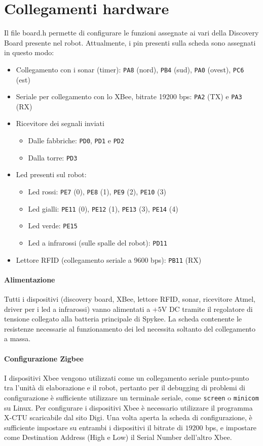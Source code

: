 \section{Collegamenti hardware}
Il file board.h permette di configurare le funzioni assegnate ai vari della Discovery Board presente nel robot. Attualmente, i pin presenti sulla scheda sono assegnati in questo modo:
\begin{itemize}
\item Collegamento con i sonar (timer): \verb|PA8| (nord), \verb|PB4| (sud), \verb|PA0| (ovest), \verb|PC6| (est)
\item Seriale per collegamento con lo XBee, bitrate 19200 bps: \verb|PA2| (TX) e \verb|PA3| (RX)
\item Ricevitore dei segnali inviati
	\begin{itemize}
	\item Dalle fabbriche: \verb|PD0|, \verb|PD1| e \verb|PD2|
	\item Dalla torre: \verb|PD3|
	\end{itemize}
\item Led presenti sul robot:
	\begin{itemize}
	\item Led rossi: \verb|PE7| (0), \verb|PE8| (1), \verb|PE9| (2), \verb|PE10| (3)
	\item Led gialli: \verb|PE11| (0), \verb|PE12| (1), \verb|PE13| (3), \verb|PE14| (4)
	\item Led verde: \verb|PE15|
	\item Led a infrarossi (sulle spalle del robot): \verb|PD11|
	\end{itemize}
\item Lettore RFID (collegamento seriale a 9600 bps): \verb|PB11| (RX)
\end{itemize}

\paragraph{Alimentazione} Tutti i dispositivi (discovery board, XBee, lettore RFID, sonar, ricevitore Atmel, driver per i led a infrarossi) vanno alimentati a $+5$V DC tramite il regolatore di tensione collegato alla batteria principale di Spykee. La scheda contenente le resistenze necessarie al funzionamento dei led necessita soltanto del collegamento a massa.

\paragraph{Configurazione Zigbee} I dispositivi Xbee vengono utilizzati come un collegamento seriale punto-punto tra l'unità di elaborazione e il robot, pertanto per il debugging di problemi di configurazione è sufficiente utilizzare un terminale seriale, come \verb|screen| o \verb|minicom| su Linux. Per configurare i dispositivi Xbee è necessario utilizzare il programma X-CTU scaricabile dal sito Digi. Una volta aperta la scheda di configurazione, è sufficiente impostare su entrambi i dispositivi il bitrate di $19200$ bps, e impostare come Destination Address (High e Low) il Serial Number dell'altro Xbee.
